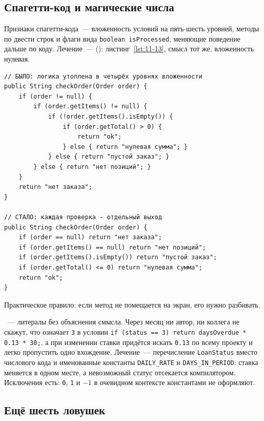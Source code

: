 \subsection{Спагетти-код и магические числа}

Признаки спагетти-кода~--- вложенность условий на пять-шесть уровней, методы по
двести строк и флаги вида \texttt{boolean isProcessed}, меняющие поведение
дальше по коду. Лечение~---  ():
листинг~\ref{lst:11-13}, смысл тот же, вложенность нулевая.

\begin{listing}[H]
\begin{verbatim}
// БЫЛО: логика утоплена в четырёх уровнях вложенности
public String checkOrder(Order order) {
    if (order != null) {
        if (order.getItems() != null) {
            if (!order.getItems().isEmpty()) {
                if (order.getTotal() > 0) {
                    return "ok";
                } else { return "нулевая сумма"; }
            } else { return "пустой заказ"; }
        } else { return "нет позиций"; }
    }
    return "нет заказа";
}

// СТАЛО: каждая проверка - отдельный выход
public String checkOrder(Order order) {
    if (order == null) return "нет заказа";
    if (order.getItems() == null) return "нет позиций";
    if (order.getItems().isEmpty()) return "пустой заказ";
    if (order.getTotal() <= 0) return "нулевая сумма";
    return "ok";
}
\end{verbatim}
\caption{Глубокая вложенность и ранние возвраты}
\label{lst:11-13}
\end{listing}

Практическое правило: если метод не помещается на экран, его нужно разбивать.

~--- литералы без объяснения смысла. Через месяц ни автор,
ни коллега не скажут, что означает \texttt{3} в условии
\texttt{if (status == 3) return daysOverdue * 0.13 * 30;}, а при изменении
ставки придётся искать \texttt{0.13} по всему проекту и легко пропустить одно
вхождение. Лечение~--- перечисление \texttt{LoanStatus} вместо числового кода и
именованные константы \texttt{DAILY\_RATE} и \texttt{DAYS\_IN\_PERIOD}: ставка
меняется в одном месте, а невозможный статус отсекается компилятором.
Исключения есть: \texttt{0}, \texttt{1} и $-1$ в очевидном контексте
константами не оформляют.

\subsection{Ещё шесть ловушек}

